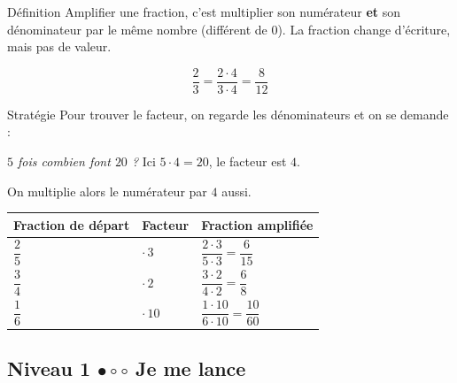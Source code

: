 \begin{regle}{Définition}
\textcolor{themeColor}{Amplifier} une fraction, c'est multiplier son numérateur \textbf{et} son dénominateur par le même nombre (différent de 0). La fraction change d'écriture, mais pas de valeur.

\[\dfrac{2}{3}=\dfrac{2 \cdot 4}{3 \cdot 4}=\dfrac{8}{12}\]
\end{regle}

\vspace{20pt}
\begin{astuce}{Stratégie}
Pour trouver le facteur, on regarde les dénominateurs et on se demande :

\vspace{5pt}
{\centering\textit{\og $5$ fois combien font $20$ ?\fg{}} Ici $5 \cdot 4 = 20$, le facteur est $4$.\par}

\vspace{5pt}
On multiplie alors le numérateur par $4$ aussi.
\end{astuce}

\vspace{20pt}
\def\arraystretch{3}
\begin{tabularx}{\linewidth}{|>{\centering\arraybackslash}X|>{\centering\arraybackslash}X|>{\centering\arraybackslash}X|}
\hline
\cellcolor{themeNO!30}\textbf{Fraction de départ} & \cellcolor{themeNO!30}\textbf{Facteur} & \cellcolor{themeNO!30}\textbf{Fraction amplifiée} \\\hline
$\dfrac{2}{5}$ & $\cdot\, 3$ & $\dfrac{2 \cdot 3}{5 \cdot 3}=\dfrac{6}{15}$ \\\hline
$\dfrac{3}{4}$ & $\cdot\, 2$ & $\dfrac{3 \cdot 2}{4 \cdot 2}=\dfrac{6}{8}$ \\\hline
$\dfrac{1}{6}$ & $\cdot\, 10$ & $\dfrac{1 \cdot 10}{6 \cdot 10}=\dfrac{10}{60}$ \\\hline
\end{tabularx}
\def\arraystretch{1}


\newpage
\subsection{Niveau 1 \quad $\bullet\circ\circ$ \quad Je me lance}

 
